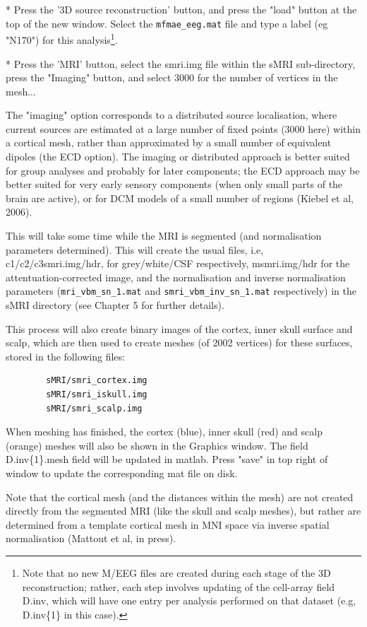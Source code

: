 * Press the '3D source reconstruction' button, and press the "load" button at the top of the new window. Select the \verb!mfmae_eeg.mat! file and type a label (eg "N170") for this analysis\footnote{Note that no new M/EEG files are created during each stage of the 3D reconstruction; rather, each step involves updating of the cell-array field D.inv, which will have one entry per analysis performed on that dataset (e.g, D.inv\{1\} in this case).}.

* Press the 'MRI' button, select the smri.img file within the sMRI sub-directory, press the "Imaging" button, and select 3000 for the number of vertices in the mesh...

The "imaging" option corresponds to a distributed source localisation, where current sources are estimated at a large number of fixed points (3000 here) within a cortical mesh, rather than approximated by a small number of equivalent dipoles (the ECD option). The imaging or distributed approach is better suited for group analyses and probably for later components; the ECD approach may be better suited for very early sensory components (when only small parts of the brain are active), or for DCM models of a small number of regions (Kiebel et al, 2006).

This will take some time while the MRI is segmented (and normalisation parameters determined). This will create the usual files, i.e, c1/c2/c3smri.img/hdr, for grey/white/CSF respectively, msmri.img/hdr for the attentuation-corrected image, and the normalisation and inverse normalisation parameters (\verb!mri_vbm_sn_1.mat! and \verb!smri_vbm_inv_sn_1.mat! respectively) in the sMRI directory (see Chapter 5 for further details).

This process will also create binary images of the cortex, inner skull surface and scalp, which are then used to create meshes (of 2002 vertices) for these surfaces, stored in the following files:
\begin{verbatim}
        sMRI/smri_cortex.img
        sMRI/smri_iskull.img
        sMRI/smri_scalp.img
\end{verbatim}
When meshing has finished, the cortex (blue), inner skull (red) and scalp (orange) meshes will also be shown in the Graphics window. The field D.inv\{1\}.mesh field will be updated in matlab. Press "save" in top right of window to update the corresponding mat file on disk.

Note that the cortical mesh (and the distances within the mesh) are not created directly from the segmented MRI (like the skull and scalp meshes), but rather are determined from a template cortical mesh in MNI space via inverse spatial normalisation (Mattout et al, in press).

